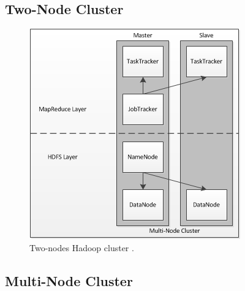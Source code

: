 \subsection{Two-Node Cluster}
\cite{nollmulti}

\begin{figure}[htbp]
  \centering
    \includegraphics{./img/twonode}
  \caption{Two-nodes Hadoop cluster \cite{nollmulti}.}
  \label{fig:twonode}
\end{figure}

\subsection{Multi-Node Cluster}